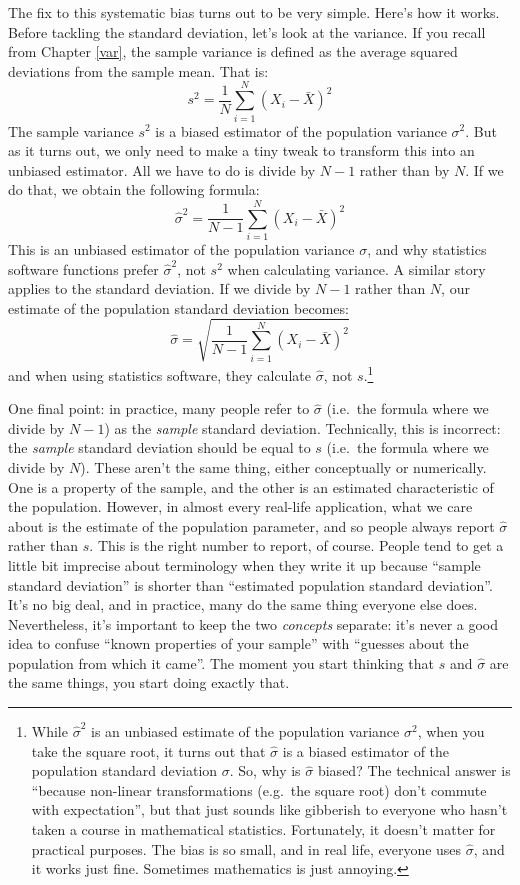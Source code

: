 \documentclass[
  11pt,
  a4paper,
  twoside,symmetric,openright]{book}
\theoremstyle{break}
\theoremstyle{break}
\begin{document}
The fix to this systematic bias turns out to be very simple. Here's how it works. Before tackling the standard deviation, let's look at the variance. If you recall from Chapter \ref{var}, the sample variance is defined as the average squared deviations from the sample mean. That is:
\[
s^2 = \frac{1}{N} \sum_{i=1}^N (X_i - \bar{X})^2
\]
The sample variance \(s^2\) is a biased estimator of the population variance \(\sigma^2\). But as it turns out, we only need to make a tiny tweak to transform this into an unbiased estimator. All we have to do is divide by \(N-1\) rather than by \(N\). If we do that, we obtain the following formula:
\[
\hat\sigma^2 = \frac{1}{N-1} \sum_{i=1}^N (X_i - \bar{X})^2 
\]
This is an unbiased estimator of the population variance \(\sigma\), and why statistics software functions prefer \(\hat\sigma^2\), not \(s^2\) when calculating variance. A similar story applies to the standard deviation. If we divide by \(N-1\) rather than \(N\), our estimate of the population standard deviation becomes:
\[
\hat\sigma = \sqrt{\frac{1}{N-1} \sum_{i=1}^N (X_i - \bar{X})^2} 
\]
and when using statistics software, they calculate \(\hat\sigma\), not \(s\).\footnote{While \(\hat\sigma^2\) is an unbiased estimate of the population variance \(\sigma^2\), when you take the square root, it turns out that \(\hat\sigma\) is a biased estimator of the population standard deviation \(\sigma\). So, why is \(\hat\sigma\) biased? The technical answer is ``because non-linear transformations (e.g.~the square root) don't commute with expectation'', but that just sounds like gibberish to everyone who hasn't taken a course in mathematical statistics. Fortunately, it doesn't matter for practical purposes. The bias is so small, and in real life, everyone uses \(\hat\sigma\), and it works just fine. Sometimes mathematics is just annoying.}

One final point: in practice, many people refer to \(\hat{\sigma}\) (i.e.~the formula where we divide by \(N-1\)) as the \emph{sample} standard deviation. Technically, this is incorrect: the \emph{sample} standard deviation should be equal to \(s\) (i.e.~the formula where we divide by \(N\)). These aren't the same thing, either conceptually or numerically. One is a property of the sample, and the other is an estimated characteristic of the population. However, in almost every real-life application, what we care about is the estimate of the population parameter, and so people always report \(\hat\sigma\) rather than \(s\). This is the right number to report, of course. People tend to get a little bit imprecise about terminology when they write it up because ``sample standard deviation'' is shorter than ``estimated population standard deviation''. It's no big deal, and in practice, many do the same thing everyone else does. Nevertheless, it's important to keep the two \emph{concepts} separate: it's never a good idea to confuse ``known properties of your sample'' with ``guesses about the population from which it came''. The moment you start thinking that \(s\) and \(\hat\sigma\) are the same things, you start doing exactly that.
\end{document}
